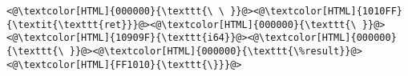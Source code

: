 \begin{lstlisting}
<@\textcolor[HTML]{000000}{\texttt{\ \ }}@><@\textcolor[HTML]{1010FF}{\textit{\texttt{ret}}}@><@\textcolor[HTML]{000000}{\texttt{\ }}@><@\textcolor[HTML]{10909F}{\texttt{i64}}@><@\textcolor[HTML]{000000}{\texttt{\ }}@><@\textcolor[HTML]{000000}{\texttt{\%result}}@>
<@\textcolor[HTML]{FF1010}{\texttt{\}}}@>

\end{lstlisting}
